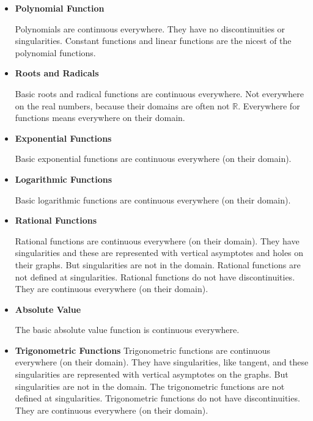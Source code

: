 \documentclass{ximera}
\begin{document}
\begin{itemize} 

\item \textbf{Polynomial Function}  

Polynomials are continuous everywhere. They have no discontinuities or singularities. Constant functions and linear functions are the nicest of the polynomial functions.






\item \textbf{Roots and Radicals}

Basic roots and radical functions are continuous everywhere.  Not everywhere on the real numbers, because their domains are often not $\mathbb{R}$. Everywhere for functions means everywhere on their domain.






\item \textbf{Exponential Functions}

Basic exponential functions are continuous everywhere (on their domain).





\item \textbf{Logarithmic Functions}

Basic logarithmic functions are continuous everywhere (on their domain).






\item \textbf{Rational Functions}

Rational functions are continuous everywhere (on their domain).  They have singularities and these are represented with vertical asymptotes and holes on their graphs.  But singularities are not in the domain.  Rational functions are not defined at singularities. Rational functions do not have discontinuities.  They are continuous everywhere (on their domain). 





\item \textbf{Absolute Value}

The basic absolute value function is continuous everywhere.







\item \textbf{Trigonometric Functions}
Trigonometric functions are continuous everywhere (on their domain).  They have singularities, like tangent, and these singularities are represented with vertical asymptotes on the graphs.  But singularities are not in the domain.  The trigonometric functions are not defined at singularities. Trigonometric functions do not have discontinuities.  They are continuous everywhere (on their domain). 








\end{itemize}
\end{document}
